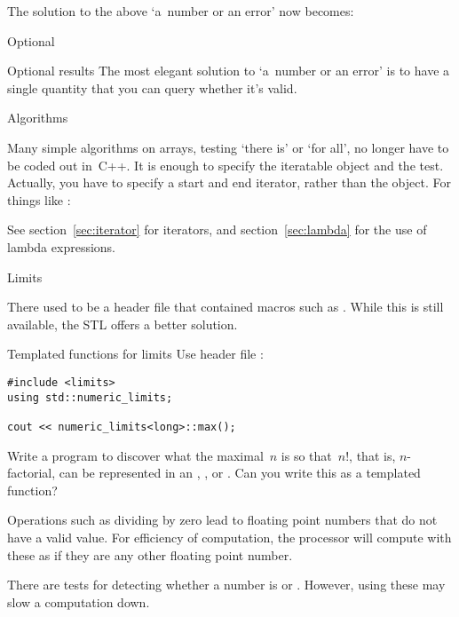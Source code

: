 The solution to the above `a~number or an error' now becomes:
%

 {Optional}

\begin{block}{Optional results}
  \label{sl:optional-root}
  The most elegant solution to `a~number or an error' is to have a
  single quantity that you can query whether it's valid.
\end{block}

 {Algorithms}

Many simple algorithms on arrays, testing `there is' or `for all', no
longer have to be coded out in~C++. It is enough to specify the
iteratable object and the test. Actually, you have to specify a start
and end iterator, rather than the object. For things like
:
%

See section~\ref{sec:iterator} for iterators, and
section~\ref{sec:lambda} for the use of lambda expressions.

 {Limits}
\label{sec:limits}

There used to be a header file  that contained
macros such as . While this is still available,
the \ac{STL} offers a better solution.

\begin{block}{Templated functions for limits}
  \label{sl:stl-limits}
  Use header file :
\begin{lstlisting}
#include <limits>
using std::numeric_limits;

cout << numeric_limits<long>::max();
\end{lstlisting}
\end{block}

\begin{exercise}
  \label{ex:big-factorial}
  Write a program to discover what the maximal~$n$ is so that~$n!$,
  that is, $n$-factorial, can be represented in an , ,
  or . Can you write this as a templated function?
\end{exercise}

Operations such as dividing by zero lead to floating point numbers
that do not have a valid value. For efficiency of computation, the
processor will compute with these as if they are any other floating
point number.

There are tests for detecting whether a number is  or
. However, using these may slow a computation down.

